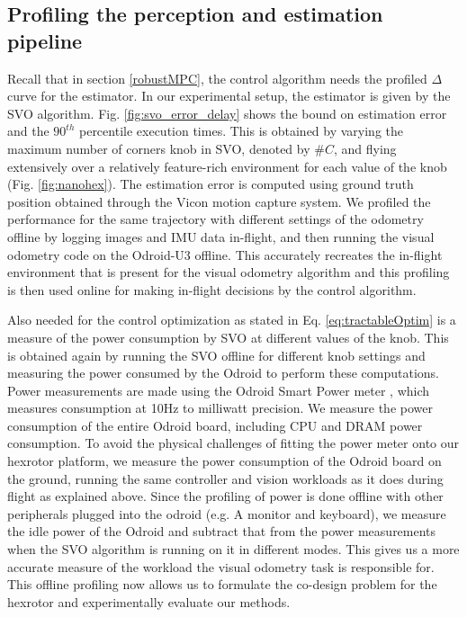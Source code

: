 

\subsection{Profiling the perception and estimation pipeline}

Recall that in section \ref{robustMPC}, the control algorithm needs the profiled $\Delta$ curve for the estimator. 
In our experimental setup, the estimator is given by the SVO algorithm. 
Fig. \ref{fig:svo_error_delay} shows the bound on estimation error and the $90^{th}$ percentile execution times.
This is obtained by varying the maximum number of corners knob in SVO, denoted by $\#C$, and flying extensively over a relatively feature-rich environment for each value of the knob (Fig. \ref{fig:nanohex}). 
The estimation error is computed using ground truth position obtained through the Vicon motion capture system. 
We profiled the performance for the same trajectory with different settings of the odometry offline by logging images and IMU data in-flight, and then running the visual odometry code on the Odroid-U3 offline.
This accurately recreates the in-flight environment that is present for the visual odometry algorithm and this profiling is then used online for making in-flight decisions by the control algorithm.

Also needed for the control optimization as stated in Eq. \ref{eq:tractableOptim} is a measure of the power consumption by SVO at different values of the knob. 
This is obtained again by running the SVO offline for different knob settings and measuring the power consumed by the Odroid to perform these computations. 
Power measurements are made using the Odroid Smart Power meter \cite{OdroidSmartPower}, which measures consumption at 10Hz to milliwatt precision. 
We measure the power consumption of the entire Odroid board, including CPU and DRAM power consumption. To avoid the physical challenges of fitting the power meter onto our hexrotor platform, we measure the power consumption of the Odroid board on the ground, running the same controller and vision workloads as it does during flight as explained above. Since the profiling of power is done offline with other peripherals plugged into the odroid (e.g. A monitor and keyboard), we measure the idle power of the Odroid and subtract that from the power measurements when the SVO algorithm is running on it in different modes. This gives us a more accurate measure of the workload the visual odometry task is responsible for. This offline profiling now allows us to formulate the co-design problem for the hexrotor and experimentally evaluate our methods.


